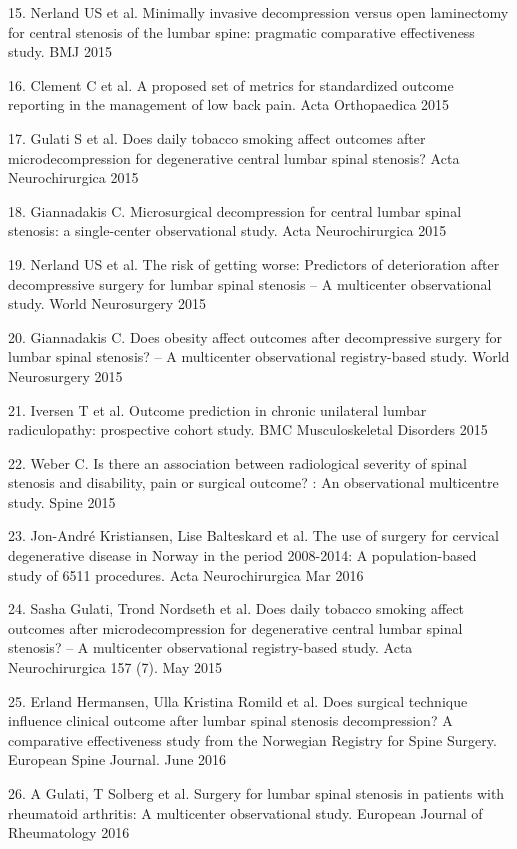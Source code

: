 \documentclass[norsk, a4paper, twocolumn]{report}
\begin{document}
15.	Nerland US et al. Minimally invasive decompression versus open laminectomy for central stenosis of the lumbar spine: pragmatic comparative effectiveness study.  BMJ 2015

16.	Clement C et al. A proposed set of metrics for standardized outcome reporting in the management of low back pain. Acta Orthopaedica  2015

17.	Gulati S et al. Does daily tobacco smoking affect outcomes after microdecompression for degenerative central lumbar spinal stenosis?  Acta Neurochirurgica  2015

18.	Giannadakis C. Microsurgical decompression for central lumbar spinal stenosis: a single-center observational study. Acta Neurochirurgica  2015

19.	Nerland US et al. The risk of getting worse: Predictors of deterioration after decompressive surgery for lumbar spinal stenosis – A multicenter observational study.  World Neurosurgery 2015

20.	Giannadakis C.  Does obesity affect outcomes after decompressive surgery for lumbar spinal stenosis? – A multicenter observational registry-based study. World Neurosurgery 2015

21.	Iversen T et al. Outcome prediction in chronic unilateral lumbar radiculopathy: prospective cohort study. BMC Musculoskeletal Disorders 2015

22.	Weber C. Is there an association between radiological severity of spinal stenosis and disability, pain or surgical outcome? :  An observational multicentre study. Spine 2015

23.	Jon-André Kristiansen, Lise Balteskard et al. The use of surgery for cervical degenerative disease in Norway in the period 2008-2014: A population-based study of 6511 procedures. Acta Neurochirurgica Mar 2016

24.	Sasha Gulati, Trond Nordseth et al. Does daily tobacco smoking affect outcomes after microdecompression for degenerative central lumbar spinal stenosis? – A multicenter observational registry-based study. Acta Neurochirurgica 157 (7). May 2015

25.	Erland Hermansen, Ulla Kristina Romild et al. Does surgical technique influence clinical outcome after lumbar spinal stenosis decompression? A comparative effectiveness study from the Norwegian Registry for Spine Surgery. European Spine Journal. June 2016

26.	A Gulati, T Solberg et al. Surgery for lumbar spinal stenosis in patients with rheumatoid arthritis: A multicenter observational study. European Journal of Rheumatology 2016 
\end{document}
